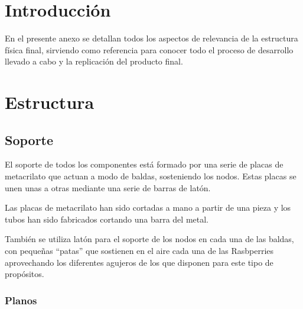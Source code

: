 \documentclass{article}
\title{\hmwkTitle}
\author{\textbf{\hmwkAuthorName}}
\date{\hmwkDueDate}
\begin{document}
\maketitle


\setcounter{tocdepth}{1}

\tableofcontents
\newpage

\section{Introducción}

En el presente anexo se detallan todos los aspectos de relevancia de la estructura física final, sirviendo como referencia para conocer todo el proceso de desarrollo llevado a cabo y la replicación del producto final.

\section{Estructura}

\subsection{Soporte}

El soporte de todos los componentes está formado por una serie de placas de metacrilato que actuan a modo de baldas, sosteniendo los nodos. Estas placas se unen unas a otras mediante una serie de barras de latón.

Las placas de metacrilato han sido cortadas a mano a partir de una pieza y los tubos han sido fabricados cortando una barra del metal.

También se utiliza latón para el soporte de los nodos en cada una de las baldas, con pequeñas ``patas'' que sostienen en el aire cada una de las Rasbperries aprovechando los diferentes agujeros de los que disponen para este tipo de propósitos.


\subsubsection{Planos}
\end{document}
